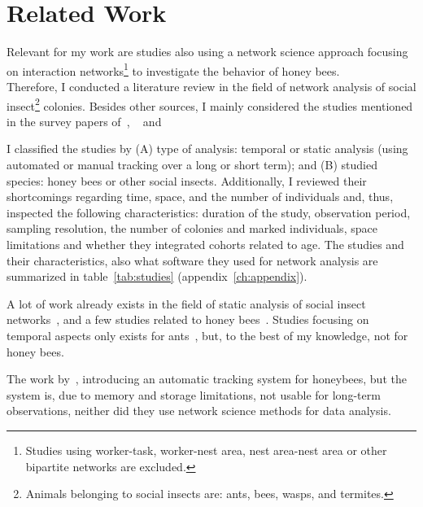 \chapter{Related Work}
\label{ch:relatedwork}

Relevant for my work are studies also using a network science approach focusing on interaction networks\footnote{Studies using worker-task, worker-nest area, nest area-nest area or other bipartite networks are excluded.} to investigate the behavior of honey bees.\\
Therefore, I conducted a literature review in the field of network analysis of social insect\footnote{Animals belonging to social insects are: ants, bees, wasps, and termites.} colonies.
Besides other sources, I mainly considered the studies mentioned in the survey papers of~\textcite{Pinter-Wollman2014}, ~\textcite[chapter~15]{krause2014animal} and~\textcite{charbonneau2013social}

I classified the studies by (A) type of analysis: temporal or static analysis (using automated or manual tracking over a long or short term); and (B) studied species: honey bees or other social insects.
Additionally, I reviewed their shortcomings regarding time, space, and the number of individuals and, thus, inspected the following characteristics: duration of the study, observation period, sampling resolution, the number of colonies and marked individuals, space limitations and whether they integrated cohorts related to age. The studies and their characteristics, also what software they used for network analysis are summarized in table~\ref{tab:studies} (appendix~\ref{ch:appendix}).

A lot of work already exists in the field of static analysis of social insect networks~\cite{greenwald2015ant,pinter2011effect,otterstatter2007contact,quevillon2015social,naug2009structure,formica2012fitness,waters2012information,sendova2010emergency}, and a few studies related to honey bees~\cite{baracchi2014socio,naug2008structure,scholl2011olfactory,naug2007experimentally}.
Studies focusing on temporal aspects only exists for ants~\cite{mersch2013tracking,blonder2011time,jeanson2012long}, but, to the best of my knowledge, not for honey bees.

The work by~\textcite{kimura2011new}, introducing an automatic tracking system for honeybees, but the system is, due to memory and storage limitations, not usable for long-term observations, neither did they use network science methods for data analysis.

